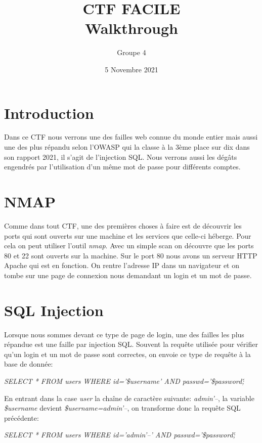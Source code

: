 \documentclass{article}
\title{\textbf{CTF FACILE}\\ \textbf{Walkthrough}}
\author{Groupe 4}
\date{5 Novembre 2021}
\begin{document}
\maketitle

\section*{Introduction}
Dans ce CTF nous verrons une des failles web connue du monde entier mais aussi une des plus répandu selon l'OWASP qui la classe à la 3ème place sur dix dans son rapport 2021, il s'agit de l'injection SQL. Nous verrons aussi les dégâts engendrés par l'utilisation d'un même mot de passe pour différents comptes.
\section{NMAP}
Comme dans tout CTF, une des premières choses à faire est de découvrir les ports qui sont ouverts sur une machine et les services que celle-ci héberge. Pour cela on peut utiliser l'outil \textit{nmap}. Avec un simple scan on découvre que les ports 80 et 22 sont ouverts sur la machine. 
Sur le port 80 nous avons un serveur HTTP Apache qui est en fonction. On rentre l'adresse IP dans un navigateur et on tombe sur une page de connexion nous demandant un login et un mot de passe.
\section{SQL Injection}
Lorsque nous sommes devant ce type de page de login, une des failles les plus répandue est une faille par injection SQL. Souvent la requête utilisée pour vérifier qu'un login et un mot de passe sont correctes, on envoie ce type de requête à la base de donnée:\newline

\begin{center}
    \textit{SELECT * FROM users WHERE id='\$username' AND passwd='\$password\';}\newline
\end{center}


En entrant dans la case \textit{user} la chaîne de caractère suivante: \textit{admin'--}, la variable \textit{\$username} devient \textit{\$username=admin'--}, on transforme donc la requête SQL précédente:

\begin{center}
    \textit{SELECT * FROM users WHERE id='admin'--' AND passwd='\$password\';}\newline
\end{center}
\end{document}
